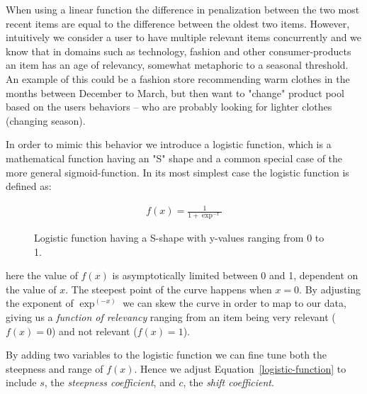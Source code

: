 When using a linear function the difference in penalization between the two
most recent items are equal to the difference between the oldest two items.
However, intuitively we consider a user to have multiple relevant items
concurrently and we know that in domains such as technology, fashion and other
consumer-products an item has an age of relevancy, somewhat metaphoric to a
seasonal threshold. An example of this could be a fashion store recommending
warm clothes in the months between December to March, but then want to "change"
product pool based on the users behaviors -- who are probably looking for
lighter clothes (changing season).

In order to mimic this behavior we introduce a logistic function, which is a
mathematical function having an "S" shape and a common special case of the more
general sigmoid-function. In its most simplest case the logistic function is
defined as:

\begin{figure}[H]
  \centering
  \noindent\begin{minipage}{.45\textwidth}
  \end{minipage}
  \begin{minipage}{.45\textwidth}
  \begin{align}
    \label{logistic-function}
    f(x) = \frac{1}{1+\exp^{-x}}
  \end{align}
  \end{minipage}
  \caption{Logistic function having a S-shape with y-values ranging
  from 0 to 1.}
\end{figure}

here the value of $f(x)$ is asymptotically limited between 0 and 1, dependent
on the value of $x$. The steepest point of the curve happens when $x=0$. By
adjusting the exponent of $\exp^{(-x)}$ we can skew the curve in order to map to our
data, giving us a \textit{function of relevancy} ranging from an item being
very relevant ($f(x)=0$) and not relevant ($f(x)=1$).

By adding two variables to the logistic function we can fine tune both the
steepness and range of $f(x)$. Hence we adjust Equation~\ref{logistic-function}
to include $s$, the \textit{steepness coefficient}, and $c$, the \textit{shift
coefficient}.

